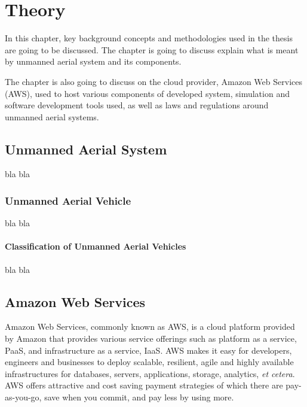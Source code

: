 
\chapter{Theory}

In this chapter, key background concepts and methodologies used in the thesis are going to be discussed. The chapter is going to discuss explain what is meant by unmanned aerial system and its components.

The chapter is also going to discuss on the cloud provider, Amazon Web Services (AWS), used to host various components of developed system, simulation and software development tools used, as well as laws and regulations around unmanned aerial systems.

\section{Unmanned Aerial System}
\label{sec:unmanned-aerial-system}

bla bla

\subsection{Unmanned Aerial Vehicle}
bla bla

\subsubsection{Classification of Unmanned Aerial Vehicles}
bla bla


\section{Amazon Web Services}
Amazon Web Services, commonly known as AWS, is a cloud platform provided by Amazon that provides various service offerings such as platform as a service, PaaS, and infrastructure as a service, IaaS\cite{awswhatisaws2022}. AWS makes it easy for developers, engineers and businesses to deploy scalable, resilient, agile and highly available infrastructures for databases, servers, applications, storage, analytics, \textit{et cetera}. AWS offers attractive and cost saving payment strategies of which there are pay-as-you-go, save when you commit, and pay less by using more\cite{awspricing2022}.

